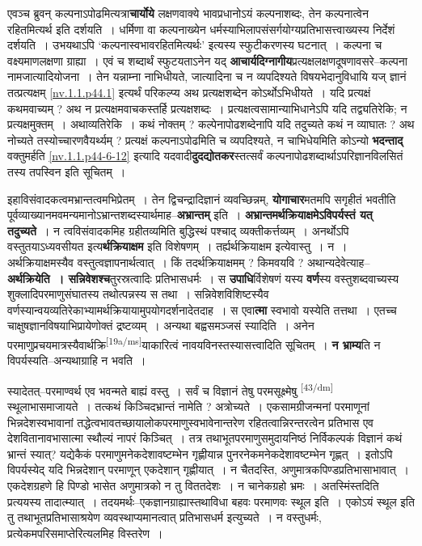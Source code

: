 \documentclass[article,12pt,a4paper]{memoir}
\begin{document}
	  \pstart एवञ्च ब्रुवन् कल्पनाऽपोढमित्यत्रा\textbf{चार्योये} लक्षणवाक्ये भावप्रधानोऽयं कल्पनाशब्दः, तेन कल्पनात्वेन रहितमित्यर्थ इति दर्शयति । धर्मिणा वा कल्पनाख्येन धर्मस्याभिलापसंसर्गयोग्यप्रतिभासत्त्वाख्यस्य निर्देशं दर्शयति । उभयथाऽपि ‘कल्पनास्वभावरहितमित्यर्थः’ इत्यस्य स्फुटीकरणस्य घटनात् । कल्पना च वक्ष्यमाणलक्षणा ग्राह्या । एवं च शब्दार्थं स्फुटयताऽनेन यद् \textbf{आचार्यदिग्नागीय}प्रत्यक्षलक्षणदूषणावसरे--कल्पना नामजात्यादियोजना । तेन यन्नाम्ना नाभिधीयते, जात्यादिना च न व्यपदिश्यते विषयभेदानुविधायि यज् ज्ञानं तत्प्रत्यक्षम् \cref{nv.1.1.p44.1} इत्यर्थं परिकल्प्य अथ प्रत्यक्षशब्देन कोऽर्थोऽभिधीयते । यदि प्रत्यक्षं कथमवाच्यम् ? अथ न प्रत्यक्षमवाचकस्तर्हि प्रत्यक्षशब्दः । प्रत्यक्षत्वसामान्याभिधानेऽपि यदि तद्व्यतिरेकि; न प्रत्यक्षमुक्तम् । अथाव्यतिरेकि । कथं नोक्तम् ? कल्पेनापोढशब्देनापि यदि तदुच्यते कथं न व्याघातः ? अथ नोच्यते तस्योच्चारणवैयर्थ्यम् ? प्रत्यक्षं कल्पनाऽपोढमिति च व्यपदिश्यते, न चाभिधेयमिति कोऽन्यो \textbf{भदन्ताद्} वक्तुमर्हति \cref{nv.1.1.p44-6-12} इत्यादि यदवादी\textbf{दुदद्योतकर}स्तत्सर्वं कल्पनापोढशब्दार्थाऽपरिज्ञानविलसितं तस्य तपस्विन इति सूचितम् ।
	\pend
      

	  \pstart इहाविसंवादकत्वमभ्रान्तत्वमभिप्रेतम् । तेन द्विचन्द्रादिज्ञानं व्यवच्छिन्नम्, \textbf{योगाचार}मतमपि सगृहीतं भवतीति पूर्वव्याख्यानमवमन्यमानोऽभ्रान्तशब्दस्यार्थमाह--\textbf{अभ्रान्तम्} इति । \textbf{अभ्रान्तमर्थक्रियाक्षमेऽविपर्यस्तं यत् तदुच्यते} । न त्वविसंवादकमिह ग्रहीतव्यमिति बुद्धिस्थं पश्चाद् व्यक्तीकर्त्तव्यम् । अनर्थोऽपि वस्तुतयाऽध्यवसीयत इत्य\textbf{र्थक्रियाक्षम} इति विशेषणम् । तर्ह्यर्थक्रियाक्षम इत्येवास्तु । न । अर्थक्रियाक्षमस्यैव वस्तुत्वज्ञापनार्थत्वात् । किं तदर्थक्रियाक्षमम् ? किमवयवि ? अथान्यदेवेत्याह--\textbf{अर्थक्रियेति । सन्निवेशश्च}तुरस्रत्वादिः प्रतिभासधर्मः । स \textbf{उपाधि}र्विशेषणं यस्य \textbf{वर्ण}स्य वस्तुशब्दवाच्यस्य शुक्लादिपरमाणुसंघातस्य तथोत्पन्नस्य स तथा । सन्निवेशविशिष्टस्यैव वर्णस्यान्वयव्यतिरेकाभ्यामर्थक्रियायामुपयोगदर्शनादेतदाह । स एवा\textbf{त्मा} स्वभावो यस्येति तत्तथा । एतच्च चाक्षुषज्ञानविषयाभिप्रायेणोक्तं द्रष्टव्यम् । अन्यथा बह्वसमञ्जसं स्यादिति । अनेन परमाणुप्रचयमात्रस्यैवार्थक्रि\leavevmode\textsuperscript{\rmlatinfont\tiny [19a/ms]}याकारित्वं नावयविनस्तस्यासत्त्वादिति सूचितम् । \textbf{न भ्राम्य}ति न विपर्यस्यति--अन्यथाग्राहि न भवति ।
	\pend
      

	  \pstart स्यादेतत्--परमाण्वर्थ एव भवन्मते बाह्यं वस्तु । सर्वं च विज्ञानं तेषु परमसूक्ष्मेषु  \leavevmode\textsuperscript{\rmlatinfont\tiny [43/dm]} स्थूलाभासमाजायते । तत्कथं किञ्चिदभ्रान्तं नामेति ? अत्रोच्यते । एकसामग्रीजन्मनां परमाणूनां भिन्नदेशस्वभावानां तद्धेत्वभावतच्छायालोकपरमाणुस्वभावेनान्तरेण रहितत्वान्निरन्तरत्वेन प्रतिभास एव देशवितानावभासात्मा स्थौल्यं नापरं किञ्चित् । तत्र तथाभूतपरमाणुसमुदायनिष्ठं निर्विकल्पकं विज्ञानं कथं भ्रान्तं स्यात्? यद्येकैकं परमाणुमनेकदेशावष्टम्भेन गृह्णीयान्न पुनरनेकमनेकदेशावष्टम्भेन गृह्णत् । इतोऽपि विपर्यस्येद् यदि भिन्नदेशान् परमाणून् एकदेशान् गृह्णीयात् । न चैतदस्ति, अणुमात्रकपिण्डप्रतिभासाभावात् । एकदेशग्रहणे हि पिण्डो भासेत अणुमात्रको न तु विततदेशः । न चानेकग्रहो भ्रमः । अतस्मिंस्तदिति प्रत्ययस्य तादात्म्यात् । तदयमर्थः--एकज्ञानग्राह्यास्तथाविधा बहवः परमाणवः स्थूल इति । एकोऽयं स्थूल इति तु तथाभूतप्रतिभासाश्रयेण व्यवस्थाप्यमानत्वात् प्रतिभासधर्म इत्युच्यते । न वस्तुधर्मः, प्रत्येकमपरिसमाप्तेरित्यलमिह विस्तरेण ।
	\pend
      
\end{document}
